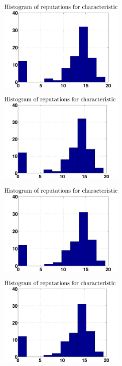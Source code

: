 \documentclass[12pt,a4paper]{article}
\begin{document}
\begin{figure}
\centering
\begin{subfigure}[b]{0.48\textwidth}
\includegraphics[width = 6cm]{noPreprocess/reputationHistK10c1.eps}
\end{subfigure}
\begin{subfigure}[b]{0.48\textwidth}
\includegraphics[width = 6cm]{noPreprocess/reputationHistK10c2.eps}
\end{subfigure}
\begin{subfigure}[b]{0.48\textwidth}
\includegraphics[width = 6cm]{noPreprocess/reputationHistK200c1.eps}
\end{subfigure}
\begin{subfigure}[b]{0.48\textwidth}
\includegraphics[width = 6cm]{noPreprocess/reputationHistK200c2.eps}

\end{subfigure}
\end{figure}
\end{document}
